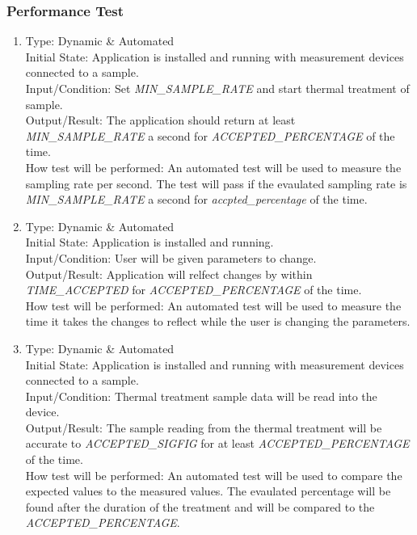 \documentclass[12pt, titlepage]{article}
\begin{document}
\subsubsection{Performance Test}

\begin{adjustwidth}{2.2em}{0pt}
\begin{enumerate}[{NF-PT}1.]
  \item Type: Dynamic \& Automated\\
  Initial State: Application is installed and running with measurement devices connected to a sample.\\
  Input/Condition: Set \textsl{MIN\_SAMPLE\_RATE} and start thermal treatment of sample.\\
  Output/Result: The application should return at least \textsl{MIN\_SAMPLE\_RATE} a second for \textsl{ACCEPTED\_PERCENTAGE} of the time.\\
  How test will be performed: An automated test will be used to measure the sampling rate per second. The test will pass if the evaulated sampling rate is \textsl{MIN\_SAMPLE\_RATE} a second for \textsl{accpted\_percentage} of the time.
  
  \item Type: Dynamic \& Automated\\
  Initial State: Application is installed and running.\\
  Input/Condition: User will be given parameters to change.\\
  Output/Result: Application will relfect changes by within \textsl{TIME\_ACCEPTED} for \textsl{ACCEPTED\_PERCENTAGE} of the time.\\
  How test will be performed: An automated test will be used to measure the time it takes the changes to reflect while the user is changing the parameters.

  \item Type: Dynamic \& Automated\\
  Initial State: Application is installed and running with measurement devices connected to a sample.\\
  Input/Condition: Thermal treatment sample data will be read into the device.\\
  Output/Result: The sample reading from the thermal treatment will be accurate to \textsl{ACCEPTED\_SIGFIG} for at least  \textsl{ACCEPTED\_PERCENTAGE} of the time.\\
  How test will be performed: An automated test will be used to compare the expected values to the measured values. The evaulated percentage will be found after the duration of the treatment and will be compared to the \textsl{ACCEPTED\_PERCENTAGE}.


\end{enumerate}
\end{adjustwidth}
\end{document}

